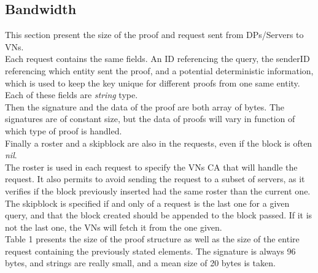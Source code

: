 \documentclass{article}
\begin{document}
\subsection{Bandwidth}
This section present the size of the proof and request sent from DPs/Servers to VNs.\\


Each request contains the same fields. An ID referencing the query, the senderID referencing which entity sent the proof, and a potential deterministic information, which is used to keep the key unique for different proofs from one same entity. Each of these fields are \textit{string} type.\\
Then the signature and the data of the proof are both array of bytes. The signatures are of constant size, but the data of proofs will vary in function of which type of proof is handled.\\
Finally a roster and a skipblock are also in the requests, even if the block is often \textit{nil}.\\
The roster is used in each request to specify the VNs CA that will handle the request. It also permits to avoid sending the request to a subset of servers, as it verifies if the block previously inserted had the same roster than the current one.\\
The skipblock is specified if and only of a request is the last one for a given query, and that the block created should be appended to the block passed. If it is not the last one, the VNs will fetch it from the one given.\\


Table 1 presents the size of the proof structure as well as the size of the entire request containing the previously stated elements. The signature is always 96 bytes, and strings are really small, and a mean size of 20 bytes is taken.\\
\end{document}
